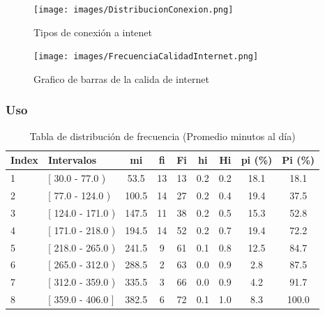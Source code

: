 \documentclass[12pt, a4paper]{article}
\begin{document}
\begin{figure}[H]
    \begin{center}
        \texttt{[image: images/DistribucionConexion.png]}
    \end{center}
    \label{fig:DistribucionConexion}
    \caption{Tipos de conexión a intenet}
\end{figure}

\begin{figure}[H]
    \begin{center}
        \texttt{[image: images/FrecuenciaCalidadInternet.png]}
    \end{center}
    \label{fig:FrecuenciaCalidadInternet}
    \caption{Grafico de barras de la calida de internet}
\end{figure}

\subsubsection{Uso}

\begin{table}[H]
    \centering

    \begin{tabular}{llccccccc}
        \toprule
        \textbf{Index} & \textbf{Intervalos} & \textbf{mi} & \textbf{fi} & \textbf{Fi} & \textbf{hi} & \textbf{Hi} & \textbf{pi (\%)} & \textbf{Pi (\%)} \\
        \midrule
        1 & [ 30.0 - 77.0 )  & 53.5  & 13 & 13 & 0.2 & 0.2 & 18.1 & 18.1 \\
        2 & [ 77.0 - 124.0 ) & 100.5 & 14 & 27 & 0.2 & 0.4 & 19.4 & 37.5 \\
        3 & [ 124.0 - 171.0 ) & 147.5 & 11 & 38 & 0.2 & 0.5 & 15.3 & 52.8 \\
        4 & [ 171.0 - 218.0 ) & 194.5 & 14 & 52 & 0.2 & 0.7 & 19.4 & 72.2 \\
        5 & [ 218.0 - 265.0 ) & 241.5 & 9  & 61 & 0.1 & 0.8 & 12.5 & 84.7 \\
        6 & [ 265.0 - 312.0 ) & 288.5 & 2  & 63 & 0.0 & 0.9 & 2.8  & 87.5 \\
        7 & [ 312.0 - 359.0 ) & 335.5 & 3  & 66 & 0.0 & 0.9 & 4.2  & 91.7 \\
        8 & [ 359.0 - 406.0 ] & 382.5 & 6  & 72 & 0.1 & 1.0 & 8.3  & 100.0 \\
        \bottomrule
    \end{tabular}
    \vspace{0.1cm}
    \caption{Tabla de distribución de frecuencia (Promedio minutos al día)}
    \label{tab:frecuenciaUso}
\end{table}
\end{document}
